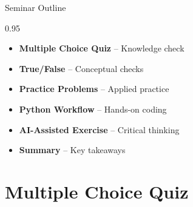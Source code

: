 \documentclass[9pt, aspectratio=169, t]{beamer}
\subtitle{Seminar 5: GARCH and Volatility Models}
\begin{document}
{
\begin{frame}
    \titlepage
\end{frame}
}


\begin{frame}{Seminar Outline}
    \begin{cminipage}{0.95\textwidth}
    \begin{itemize}
        \item \textbf{Multiple Choice Quiz} -- Knowledge check
        \vspace{0.15cm}
        \item \textbf{True/False} -- Conceptual checks
        \vspace{0.15cm}
        \item \textbf{Practice Problems} -- Applied practice
        \vspace{0.15cm}
        \item \textbf{Python Workflow} -- Hands-on coding
        \vspace{0.15cm}
        \item \textbf{AI-Assisted Exercise} -- Critical thinking
        \vspace{0.15cm}
        \item \textbf{Summary} -- Key takeaways
    \end{itemize}
    \end{cminipage}
\end{frame}

\section{Multiple Choice Quiz}
\end{document}

